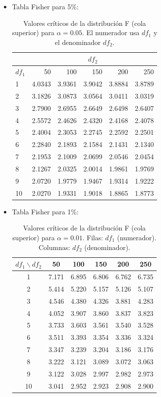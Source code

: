 \documentclass[10pt,a4paper]{article}
\begin{document}
\begin{itemize}
\item Tabla Fisher para 5\%:
\begin{table}[H]
\centering
\caption{Valores críticos de la distribución F (cola superior) para $\alpha=0.05$. 
El numerador usa $df_1$ y el denominador $df_2$.}
\label{tab:Fcrit_5pct}
\begin{tabular}{|l|r|r|r|r|r|}
\hline
& \multicolumn{5}{c|}{$df_2$} \\
\hline
$df_1$ & 50 & 100 & 150 & 200 & 250 \\
\hline
1  & 4.0343 & 3.9361 & 3.9042 & 3.8884 & 3.8789 \\
\hline
2  & 3.1826 & 3.0873 & 3.0564 & 3.0411 & 3.0319 \\
\hline
3  & 2.7900 & 2.6955 & 2.6649 & 2.6498 & 2.6407 \\
\hline
4  & 2.5572 & 2.4626 & 2.4320 & 2.4168 & 2.4078 \\
\hline
5  & 2.4004 & 2.3053 & 2.2745 & 2.2592 & 2.2501 \\
\hline
6  & 2.2840 & 2.1893 & 2.1584 & 2.1431 & 2.1340 \\
\hline
7  & 2.1953 & 2.1009 & 2.0699 & 2.0546 & 2.0454 \\
\hline
8  & 2.1267 & 2.0325 & 2.0014 & 1.9861 & 1.9769 \\
\hline
9  & 2.0720 & 1.9779 & 1.9467 & 1.9314 & 1.9222 \\
\hline
10 & 2.0270 & 1.9331 & 1.9018 & 1.8865 & 1.8773 \\
\hline
\end{tabular}
\end{table}

\item Tabla Fisher para 1\%:
\begin{table}[H]
\centering
\caption{Valores críticos de la distribución F (cola superior) para $\alpha = 0.01$.
Filas: $df_1$ (numerador). Columnas: $df_2$ (denominador).}
\label{tab:Fcrit_1pct_transpuesta}
\begin{tabular}{|c|c|c|c|c|c|}
\hline
$df_1 \backslash df_2$ 
& 50 & 100 & 150 & 200 & 250 \\
\hline
1  & 7.171 & 6.895 & 6.806 & 6.762 & 6.735 \\
\hline
2  & 5.414 & 5.220 & 5.157 & 5.126 & 5.107 \\
\hline
3  & 4.546 & 4.380 & 4.326 & 3.881 & 4.283 \\
\hline
4  & 4.052 & 3.907 & 3.860 & 3.837 & 3.823 \\
\hline
5  & 3.733 & 3.603 & 3.561 & 3.540 & 3.528 \\
\hline
6  & 3.511 & 3.393 & 3.354 & 3.336 & 3.324 \\
\hline
7  & 3.347 & 3.239 & 3.204 & 3.186 & 3.176 \\
\hline
8  & 3.222 & 3.121 & 3.089 & 3.072 & 3.063 \\
\hline
9  & 3.122 & 3.028 & 2.997 & 2.982 & 2.973 \\
\hline
10 & 3.041 & 2.952 & 2.923 & 2.908 & 2.900 \\
\hline
\end{tabular}
\end{table}

\end{itemize}

 
\end{document}
